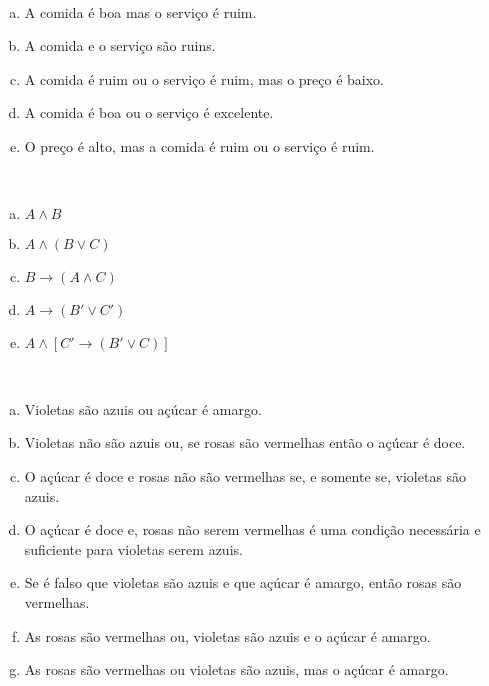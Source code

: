 \begin{Gabarito}{4}
~
        \begin{enumerate}[a)]
          \item A comida é boa mas o serviço é ruim.
          \item A comida e o serviço são ruins.
          \item A comida é ruim ou o serviço é ruim, mas o preço é baixo.
          \item A comida é boa ou o serviço é excelente.
          \item O preço é alto, mas a comida é ruim ou o serviço é ruim.
        \end{enumerate}
  
\end{Gabarito}
\begin{Gabarito}{5}
~
    \begin{multicols}{3}
      \begin{enumerate}[a)]
        \item $A \wedge B$
        \item $A \wedge (B \vee C)$
        \item $B \rightarrow (A \wedge C)$
        \item $A \rightarrow (B' \vee C')$
        \item $A \wedge [C' \rightarrow (B' \vee C)]$
      \end{enumerate}
    \end{multicols}
  
\end{Gabarito}
\begin{Gabarito}{6}
~

      \begin{enumerate}[a)]
        \item Violetas são azuis ou açúcar é amargo.
        \item Violetas não são azuis ou, se rosas são vermelhas então o açúcar é doce.
        \item O açúcar é doce e rosas não são vermelhas se, e somente se, violetas são
        azuis.
        \item O açúcar é doce e, rosas não serem vermelhas é uma condição necessária e
        suficiente para violetas serem azuis.
        \item Se é falso que violetas são azuis e que açúcar é amargo, então rosas são
        vermelhas.
        \item As rosas são vermelhas ou, violetas são azuis e o açúcar é amargo.
        \item As rosas são vermelhas ou violetas são azuis, mas o açúcar é amargo.
      \end{enumerate}

  
\end{Gabarito}
